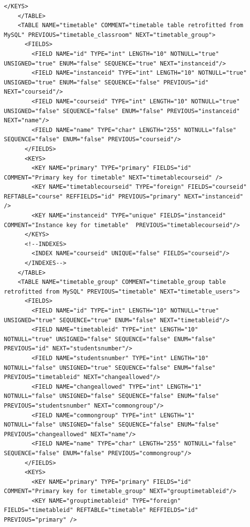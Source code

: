 \documentclass[a4paper]{report}  %
\begin{document}
\begin{lstlisting}[style=XML, caption=Fitxer xmldb install.xml per la creació de les taules]
      </KEYS> 
    </TABLE> 
    <TABLE NAME="timetable" COMMENT="timetable table retrofitted from MySQL" PREVIOUS="timetable_classroom" NEXT="timetable_group"> 
      <FIELDS> 
        <FIELD NAME="id" TYPE="int" LENGTH="10" NOTNULL="true" UNSIGNED="true" ENUM="false" SEQUENCE="true" NEXT="instanceid"/> 
		<FIELD NAME="instanceid" TYPE="int" LENGTH="10" NOTNULL="true" UNSIGNED="true" ENUM="false" SEQUENCE="false" PREVIOUS="id" NEXT="courseid"/> 
        <FIELD NAME="courseid" TYPE="int" LENGTH="10" NOTNULL="true" UNSIGNED="false" SEQUENCE="false" ENUM="false" PREVIOUS="instanceid" NEXT="name"/> 
        <FIELD NAME="name" TYPE="char" LENGTH="255" NOTNULL="false" SEQUENCE="false" ENUM="false" PREVIOUS="courseid"/> 
      </FIELDS> 
      <KEYS> 
	    <KEY NAME="primary" TYPE="primary" FIELDS="id" COMMENT="Primary key for timetable" NEXT="timetablecourseid" /> 
		<KEY NAME="timetablecourseid" TYPE="foreign" FIELDS="courseid" REFTABLE="course" REFFIELDS="id" PREVIOUS="primary" NEXT="instanceid" /> 
		<KEY NAME="instanceid" TYPE="unique" FIELDS="instanceid" COMMENT="Instance key for timetable"  PREVIOUS="timetablecourseid"/> 
      </KEYS> 
      <!--INDEXES> 
        <INDEX NAME="courseid" UNIQUE="false" FIELDS="courseid"/> 
      </INDEXES--> 
    </TABLE> 
    <TABLE NAME="timetable_group" COMMENT="timetable_group table retrofitted from MySQL" PREVIOUS="timetable" NEXT="timetable_users"> 
      <FIELDS> 
        <FIELD NAME="id" TYPE="int" LENGTH="10" NOTNULL="true" UNSIGNED="true" SEQUENCE="true" ENUM="false" NEXT="timetableid"/> 
        <FIELD NAME="timetableid" TYPE="int" LENGTH="10" NOTNULL="true" UNSIGNED="false" SEQUENCE="false" ENUM="false" PREVIOUS="id" NEXT="studentsnumber"/> 
        <FIELD NAME="studentsnumber" TYPE="int" LENGTH="10" NOTNULL="false" UNSIGNED="true" SEQUENCE="false" ENUM="false" PREVIOUS="timetableid" NEXT="changeallowed"/> 
        <FIELD NAME="changeallowed" TYPE="int" LENGTH="1" NOTNULL="false" UNSIGNED="false" SEQUENCE="false" ENUM="false" PREVIOUS="studentsnumber" NEXT="commongroup"/> 
        <FIELD NAME="commongroup" TYPE="int" LENGTH="1" NOTNULL="false" UNSIGNED="false" SEQUENCE="false" ENUM="false" PREVIOUS="changeallowed" NEXT="name"/> 
        <FIELD NAME="name" TYPE="char" LENGTH="255" NOTNULL="false" SEQUENCE="false" ENUM="false" PREVIOUS="commongroup"/> 
      </FIELDS> 
      <KEYS> 
        <KEY NAME="primary" TYPE="primary" FIELDS="id" COMMENT="Primary key for timetable_group" NEXT="grouptimetableid"/> 
		<KEY NAME="grouptimetableid" TYPE="foreign" FIELDS="timetableid" REFTABLE="timetable" REFFIELDS="id" PREVIOUS="primary" /> 

\end{lstlisting}
\end{document}
